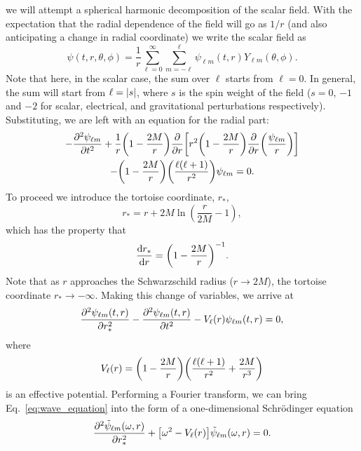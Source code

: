we will attempt a spherical harmonic decomposition of the scalar field. 
With the expectation that the radial dependence of the field will go as $1/r$ (and also anticipating a change in radial coordinate) we write the scalar field as
\begin{equation}
    \psi(t, r, \theta, \phi) = \frac{1}{r} \sum_{\ell = 0}^\infty \sum_{m = -\ell}^\ell \psi_{\ell m}(t, r) Y_{\ell m}(\theta, \phi).
\end{equation}
Note that here, in the scalar case, the sum over $\ell$ starts from $\ell = 0$.
In general, the sum will start from $\ell = \abs{s}$, where $s$ is the spin weight of the field ($s=0$, $-1$ and $-2$ for scalar, electrical, and gravitational perturbations respectively).
Substituting, we are left with an equation for the radial part:
\begin{multline}
    - \pdv[2]{\psi_{\ell m}}{t} + \frac{1}{r} \qty(1 - \frac{2M}{r}) \pdv{r} \qty[r^2 \qty(1 - \frac{2M}{r}) \pdv{r}\qty(\frac{\psi_{\ell m}}{r}) ]\\
    - \qty(1 - \frac{2M}{r}) \qty(\frac{\ell (\ell + 1)}{r^2}) \psi_{\ell m} = 0.
\end{multline}
To proceed we introduce the tortoise coordinate, $r_*$,
\begin{equation}
    r_* = r + 2M \ln(\frac{r}{2M} - 1),
\end{equation}
which has the property that
\begin{equation}
    \dv{r_*}{r} = \qty( 1 - \frac{2M}{r} )^{-1}.
\end{equation}
Note that as $r$ approaches the Schwarzschild radius ($r \rightarrow 2M$), the tortoise coordinate $r_* \rightarrow -\infty$.
Making this change of variables, we arrive at
\begin{equation}\label{eq:wave_equation}
    \pdv[2]{\psi_{\ell m}(t,r)}{r_*} - \pdv[2]{\psi_{\ell m}(t,r)}{t} - V_\ell(r) \psi_{\ell m}(t,r) = 0,
\end{equation}
where
\begin{equation}
    V_\ell(r) = \qty( 1 - \frac{2M}{r} ) \qty( \frac{\ell (\ell + 1)}{r^2} + \frac{2M}{r^3} )
\end{equation}
is an effective potential.
Performing a Fourier transform, we can bring Eq.~\ref{eq:wave_equation} into the form of a one-dimensional Schr\"{o}dinger equation
\begin{equation}\label{eq:fd_wave_equation}
    \pdv[2]{\tilde{\psi}_{\ell m}(\omega,r)}{r_*} + \qty[ \omega^2 - V_\ell(r)] \tilde{\psi}_{\ell m}(\omega,r) = 0.
\end{equation}
